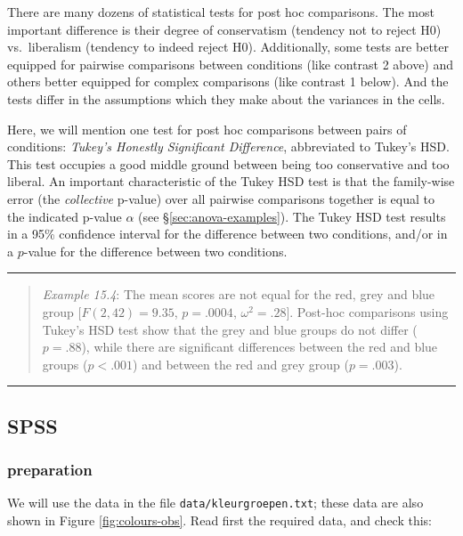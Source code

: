 \documentclass[
]{book}
\begin{document}
There are many dozens of statistical tests for post hoc
comparisons. The most important difference is their degree of conservatism
(tendency not to reject H0) vs.~liberalism (tendency to indeed reject H0).
Additionally, some tests are better equipped
for pairwise comparisons between conditions (like contrast 2 above) and
others better equipped for complex comparisons
(like contrast 1 below). And the tests differ in the assumptions
which they make about the variances in the cells.

Here, we will mention one test
for post hoc comparisons between pairs of conditions: \emph{Tukey's
Honestly Significant Difference}, abbreviated to Tukey's HSD. This test
occupies a good middle ground between being too conservative and too liberal. An
important characteristic of the Tukey HSD test is that the family-wise
error (the \emph{collective} p-value) over all pairwise comparisons together
is equal to the indicated p-value
\(\alpha\) (see §\ref{sec:anova-examples}). The Tukey HSD test results in
a 95\% confidence interval for the difference between two conditions,
and/or in a \(p\)-value for the difference between two conditions.

\begin{center}\rule{0.5\linewidth}{0.5pt}\end{center}

\begin{quote}
\emph{Example 15.4}:
The mean scores are not equal for the red, grey and blue group
\([F(2,42) = 9.35\), \(p = .0004\), \(\omega^2 = .28]\).
Post-hoc comparisons using Tukey's HSD test show that the grey and blue groups do not differ (\(p=.88\)), while there are significant differences between the red and blue groups (\(p<.001\)) and between the red and grey group (\(p=.003\)).
\end{quote}

\begin{center}\rule{0.5\linewidth}{0.5pt}\end{center}

\subsection{SPSS}\label{spss-12}

\subsubsection{preparation}\label{preparation-1}

We will use the data in the file \texttt{data/kleurgroepen.txt}; these data are also shown in Figure \ref{fig:colours-obs}.
Read first the required data, and check this:
\end{document}
